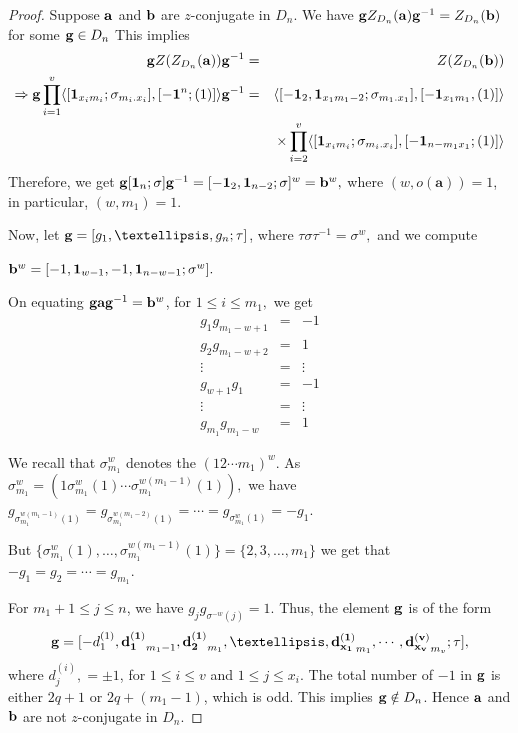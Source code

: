 \documentclass[12pt,twoside,reqno]{amsart}
\theoremstyle{definition}
\numberwithin{equation}{section}
\newcommand{\bmf}[1]{\mathbf{#1}}
\begin{document}
\begin{proof}
Suppose ${\bf a}$ and ${\bf b}$ are $z$-conjugate in $D_n.$ We have ${\bf g}{Z}_{D_n}({\bf a}){\bf g}^{-1} = {Z}_{D_n}({\bf b})$ for some ${\bf g} \in D_n$
This implies
\begin{eqnarray*}{\bf g}Z({Z}_{D_n}({\bf a})){\bf g}^{-1}& =& Z({Z}_{D_n}({\bf b}))\\
\Rightarrow{\bf g}\prod_{i=1}^v\langle[{\bf 1}_{x_im_i}; \sigma_{m_i.x_i}],[{\bf -1}^n; (1)]\rangle{\bf g}^{-1} &=& \langle[{\bf -1}_2,{\bf 1}_{x_1m_1-2}; \sigma_{m_1.x_1}],[{\bf -1}_{x_1m_1}, (1)]\rangle\\&~& \times \prod_{i=2}^v\langle[{\bf 1}_{x_im_i}; \sigma_{m_i.x_i}],[{\bf -1}_{n-m_1x_1}; (1)]\rangle
\end{eqnarray*}
Therefore, we get ${\bf g}[{\bf 1}_n; \sigma]{\bf g}^{-1} = [{\bf -1}_2, {\bf 1}_{n-2}; \sigma]^w={\bf b}^w,$ where $(w, o(\bmf{a})) = 1$, in particular, $(w, m_1) = 1$. 

Now, let ${\bf g}=[g_1,\ldots,g_n; \tau]$, where $\tau\sigma\tau^{-1} = \sigma^w,$ 
and we compute 

${\bf b}^w = [-1,{\bf 1}_{w-1},-1,{\bf 1}_{n-w-1}; \sigma^w].$

On equating ${\bf gag}^{-1} = {\bf b}^w$, for $1 \leq i \leq m_1,$ we get
\begin{eqnarray*}
g_1g_{m_1 -w +1} &=& -1\\
g_2g_{m_1 -w + 2} &=& 1\\
\vdots &=& \vdots\\
g_{w+1}g_1 &=& -1\\
\vdots &=&\vdots\\
g_{m_1}g_{m_1 -w} &=& 1
\end{eqnarray*}

We recall that $\sigma_{m_1}^w$ denotes the $(12\cdots m_1)^w.$ As $\sigma_{m_1}^w= (1\sigma_{m_1}^w(1) \cdots \sigma_{m_1}^{w(m_1-1)}(1)),$ we have
$g_{\sigma_{m_1}^{w(m_1-1)}(1)} =g_{\sigma_{m_1}^{w(m_1-2)}(1)} = \cdots = g_{\sigma_{m_1}^w(1)} = -g_1$. 

But  $\{\sigma_{m_1}^w(1), \ldots, \sigma_{m_1}^{w(m_1-1)}(1)\} = \{2,3,\ldots, m_1\}$ we get that $-g_1 = g_2 = \cdots = g_{m_1}.$

For $m_1 + 1 \leq j \leq n$, we have $g_{j}g_{\sigma^{-w}(j)} = 1$. Thus, the element ${\bf g}$ is of the form $${\bf g}= [-d^{(1)}_{1},{\bf d^{(1)}_{1}}_{m_1 - 1},{\bf d^{(1)}_2}_{m_1},\ldots,{\bf d^{(1)}_{x_1}}_{m_1},\cdots, {\bf d^{(v)}_{x_v}}_{m_v}; \tau] ,$$ where $d^{(i)}_j,= \pm 1$, for $1 \leq i \leq v$ and $1 \leq j \leq x_i$. The total number of $-1$ in ${\bf g}$ is either $2q + 1$ or $2q + (m_1 -1)$, which is odd. This implies ${\bf g} \notin D_n$. Hence ${\bf a}$ and ${\bf b}$ are  not $z$-conjugate in $D_n.$ 
\end{proof}
\end{document}
